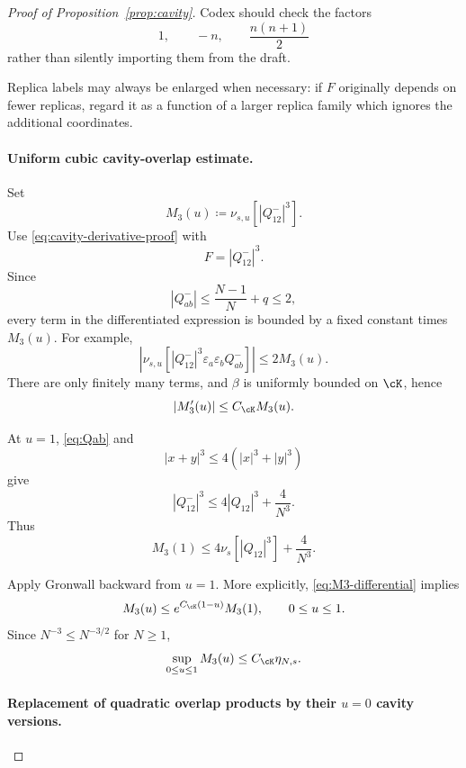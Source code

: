 \begin{proof}[Proof of Proposition~\ref{prop:cavity}]
Codex should check the factors
\[
 1,\qquad -n,\qquad \frac{n(n+1)}2
\]
rather than silently importing them from the draft.

Replica labels may always be enlarged when necessary: if $F$ originally
depends on fewer replicas, regard it as a function of a larger replica family
which ignores the additional coordinates.

\paragraph{Uniform cubic cavity-overlap estimate.}

Set
\[
 M_3(u)
 \coloneqq
 \nu_{s,u}[|Q^-_{12}|^3].
\]
Use \eqref{eq:cavity-derivative-proof} with
\[
 F=|Q^-_{12}|^3.
\]
Since
\[
 |Q^-_{ab}|
 \le
 \frac{N-1}{N}+q
 \le2,
\]
every term in the differentiated expression is bounded by a fixed constant
times $M_3(u)$.  For example,
\[
 \left|
 \nu_{s,u}\!
 \left[
 |Q^-_{12}|^3
 \varepsilon_a\varepsilon_bQ^-_{ab}
 \right]
 \right|
 \le
 2M_3(u).
\]
There are only finitely many terms, and $\beta$ is uniformly bounded on
$\cK$, hence
\begin{equation}
 |M_3'(u)|\le C_{\cK}M_3(u).
 \label{eq:M3-differential}
\end{equation}

At $u=1$, \eqref{eq:Qab} and
\[
 |x+y|^3\le4(|x|^3+|y|^3)
\]
give
\[
 |Q^-_{12}|^3
 \le
 4|Q_{12}|^3+\frac4{N^3}.
\]
Thus
\[
 M_3(1)
 \le
 4\nu_s[|Q_{12}|^3]+\frac4{N^3}.
\]

Apply Gronwall backward from $u=1$.  More explicitly,
\eqref{eq:M3-differential} implies
\[
 M_3(u)
 \le
 e^{C_{\cK}(1-u)}M_3(1),
 \qquad 0\le u\le1.
\]
Since $N^{-3}\le N^{-3/2}$ for $N\ge1$,
\begin{equation}
 \sup_{0\le u\le1}M_3(u)
 \le
 C_{\cK}\eta_{N,s}.
 \label{eq:M3-gronwall-proof}
\end{equation}

\paragraph{Replacement of quadratic overlap products by their $u=0$
cavity versions.}


\end{proof}
